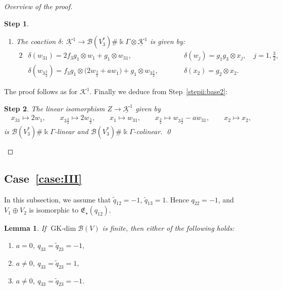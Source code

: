 \documentclass[10pt,a4paper]{amsart}
\numberwithin{equation}{section}
\newtheorem{Lemma}[Theorem]{Lemma}
\newtheorem{stepii}{Step}
\newcommand{\GK}{\operatorname{GK-dim}}
\newcommand{\toba}{\mathscr B}
\newcommand{\K}{{\mathcal{K}}}
\newcommand{\Ku}{\underline{\mathcal K}}
\newcommand{\eny}{\mathfrak{E}}
\newcommand{\tresdos}{\frac{3}{2}}
\begin{document}
\begin{proof}[Overview of the proof]
\begin{stepii}
\begin{enumerate}[label=$(\roman*)$]
\item The coaction $\delta\colon\ \Ku^1\to \toba(V_3^*)\#\Bbbk\Gamma\otimes \Ku^1$ is given by:
\begin{alignat*}{2}
&\delta(w_{31}) = 2f_3g_1 \otimes w_{1}+g_1\otimes w_{31},
&&\delta(w_{j})=g_1g_3\otimes x_{j}, \quad j=1,\tfrac{3}{2},
\\
&\delta(w_{3\tresdos}) = f_3g_1 \otimes \big(2w_{\tresdos}+aw_{1}\big)+g_1\otimes w_{3\tresdos}, \qquad
&&\delta(x_2) = g_2\otimes x_2.
\end{alignat*}
\end{enumerate}
\end{stepii}
The proof follows as for $\K^1$. Finally we deduce from Step~\ref{stepii:base2}:

\begin{stepii}\label{stepii:isomorphism}
The linear isomorphism $Z\to\Ku^1$ given by
\begin{align*}
x_{31} \mapsto 2w_1,\qquad
x_{3\tresdos} \mapsto 2w_{\tresdos},\qquad
x_{1} \mapsto w_{31},\qquad
x_{\tresdos} \mapsto w_{3\tresdos}-aw_{31},\qquad
x_{2} \mapsto x_2,
\end{align*}
is $\toba(V_3^*)\#\Bbbk\Gamma$-linear and $\toba(V_3^*)\#\Bbbk\Gamma$-colinear. \hfill \qed
\end{stepii}
\renewcommand{\qed}{}
\end{proof}

\subsection[Case~(III)]{Case~\ref{case:III}}
In this subsection, we assume that $\widetilde{q}_{12}=-1$, $\widetilde{q}_{13}=1$.
Hence $q_{22}=-1$, and $V_1\oplus V_2$ is isomorphic to $\eny_{\star}(q_{12})$.

\begin{Lemma}\label{lemma:caseIII-general}
If $\GK \toba(V)$ is finite, then either of the following holds:{\samepage
\begin{enumerate}[label=$(\Alph*)$]
\item\label{item:caseIII-A} $a = 0$, $q_{33} =\widetilde{q}_{23}= -1,$

\item\label{item:caseIII-B} $a \ne 0$, $q_{33} =\widetilde{q}_{23}= 1,$

\item\label{item:caseIII-C} $a \ne 0$, $q_{33} =\widetilde{q}_{23}= -1$.
\end{enumerate}}
\end{Lemma}
\end{document}
